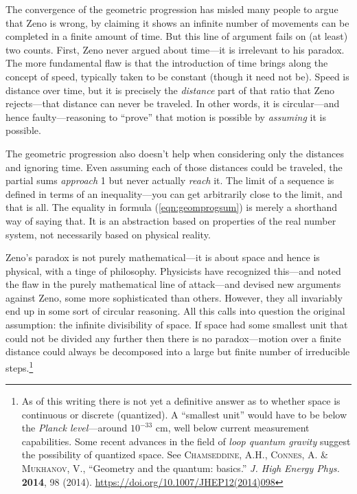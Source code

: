 The convergence of the geometric progression has misled many people to argue
that Zeno is wrong, by claiming it shows an infinite number of movements
can be completed in a finite amount of time. But this line of argument fails on
(at least) two counts. First, Zeno never argued about time---it is irrelevant to
his paradox. The more fundamental flaw is that the introduction of time brings
along the concept of speed, typically taken to be constant (though it need not
be). Speed is distance over time, but it is precisely the \emph{distance} part
of that ratio that Zeno rejects---that distance can never be traveled. In other
words, it is circular---and hence faulty---reasoning to ``prove'' that motion is
possible by \emph{assuming} it is possible.

The geometric progression also doesn't help when considering only the
distances and ignoring time. Even assuming each of those distances could be
traveled, the partial sums
\emph{approach} 1 but never actually \emph{reach} it. The limit of a
sequence is defined in terms of an inequality---you can get arbitrarily
close to the limit, and that is all. The equality in formula
(\ref{eqn:geomprogsum}) is merely a shorthand way of saying that. It is an
abstraction based on properties of the real number system, not necessarily
based on physical reality.

Zeno's paradox is not purely mathematical---it is about space and hence is
physical, with a tinge of philosophy. Physicists have recognized this---and
noted the flaw in the purely mathematical line of attack---and devised new
arguments against Zeno, some more sophisticated than others. However, they
all invariably end up in some sort of circular reasoning.
All this calls into question the original assumption: the infinite divisibility
of space. If space had some smallest unit that could not be divided any further
then there is no paradox---motion over a finite distance could always be
decomposed into a large but finite number of irreducible steps.\footnote{As of
this writing there is not yet a
definitive answer as to whether space is continuous or discrete (quantized).
A ``smallest unit'' would have to be below the \emph{Planck level}---around
$10^{-33}$ cm, well below current measurement capabilities. Some recent advances
in the field of \emph{loop quantum gravity} suggest the possibility of quantized
space. See \textsc{Chamseddine, A.H., Connes, A. \& Mukhanov, V.}, ``Geometry and
the quantum: basics.'' \emph{J. High Energy Phys.} \textbf{2014}, 98 (2014).
 \url{https://doi.org/10.1007/JHEP12(2014)098}}\vspace{1mm}

